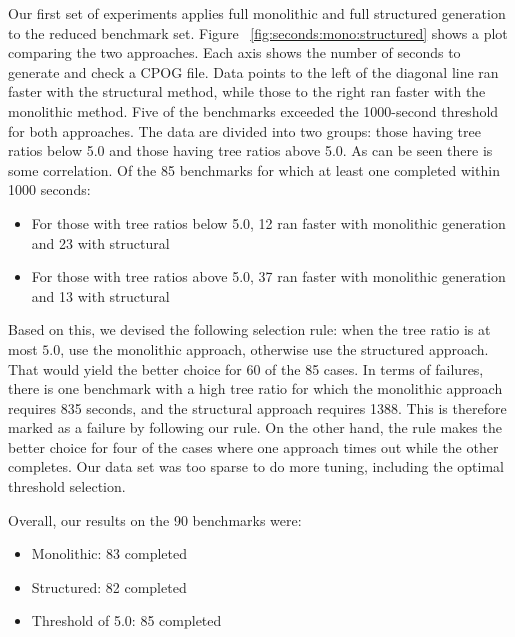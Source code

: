 \documentclass[twoside,11pt]{article}
\begin{document}
Our first set of experiments applies full monolithic and full
structured generation to the reduced benchmark set.  Figure
~\ref{fig:seconds:mono:structured} shows a plot comparing the two
approaches.  Each axis shows the number of seconds to generate and
check a CPOG file.  Data points to the left of the diagonal line ran
faster with the structural method, while those to the right ran faster
with the monolithic method.  Five of the benchmarks exceeded the 1000-second threshold for both approaches.
The data are divided into two groups:
those having tree ratios below 5.0 and those having tree ratios above
5.0.  
As can be seen there is some correlation.  Of the 85 benchmarks for which at least one completed within 1000 seconds:
\begin{itemize}
\item For those with tree ratios below 5.0, 12 ran faster with monolithic generation and 23 with structural
\item For those with tree ratios above 5.0, 37 ran faster with monolithic generation and 13 with structural
\end{itemize}
Based on this, we devised the following selection rule: when the
tree ratio is at most $5.0$, use the monolithic approach, otherwise
use the structured approach.  That would yield the better choice for
60 of the 85 cases.  In terms of failures, there is one benchmark with
a high tree ratio for which the monolithic approach requires 835
seconds, and the structural approach requires 1388. This is therefore
marked as a failure by following our rule.  On the other hand, the rule makes the better choice for four of the cases where one approach times out while the other completes.
Our data set was too sparse to do more tuning, including the optimal threshold selection.

Overall, our results on the 90 benchmarks were:
\begin{itemize}
\item Monolithic: 83 completed
\item Structured: 82 completed
\item Threshold of 5.0: 85 completed
\end{itemize}
\end{document}

